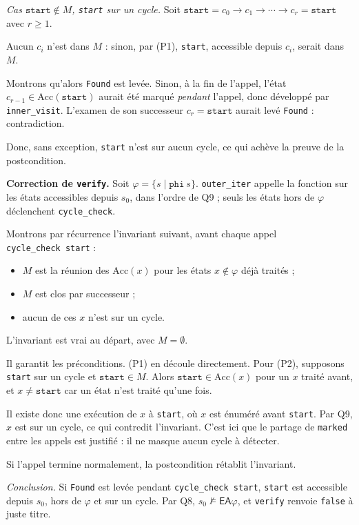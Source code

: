 \documentclass[11pt,a4paper]{article}
\providecommand{\tightlist}{\setlength{\itemsep}{0pt}\setlength{\parskip}{0pt}}
\providecommand{\varnothing}{\emptyset}
\begin{document}
\emph{Cas \(\texttt{start}\notin M\), \texttt{start} sur un cycle.} Soit \(\texttt{start}=c_0\to c_1\to\cdots\to c_r=\texttt{start}\) avec \(r\ge1\).

Aucun \(c_i\) n'est dans \(M\) : sinon, par (P1), \texttt{start}, accessible depuis \(c_i\), serait dans \(M\).

Montrons qu'alors \texttt{Found} est levée. Sinon, à la fin de l'appel, l'état \(c_{r-1}\in\mathrm{Acc}(\texttt{start})\) aurait été marqué \emph{pendant} l'appel, donc développé par \texttt{inner\_visit}. L'examen de son successeur \(c_r=\texttt{start}\) aurait levé \texttt{Found} : contradiction.

Donc, sans exception, \texttt{start} n'est sur aucun cycle, ce qui achève la preuve de la postcondition.

\textbf{Correction de \texttt{verify}.} Soit \(\varphi=\{s\mid \texttt{phi}\ s\}\). \texttt{outer\_iter} appelle la fonction sur les états accessibles depuis \(s_0\), dans l'ordre de Q9 ; seuls les états hors de \(\varphi\) déclenchent \texttt{cycle\_check}.

Montrons par récurrence l'invariant suivant, avant chaque appel \texttt{cycle\_check\ start} :

\begin{itemize}
\tightlist
\item
  \(M\) est la réunion des \(\mathrm{Acc}(x)\) pour les états \(x\notin\varphi\) déjà traités ;
\item
  \(M\) est clos par successeur ;
\item
  aucun de ces \(x\) n'est sur un cycle.
\end{itemize}

L'invariant est vrai au départ, avec \(M=\varnothing\).

Il garantit les préconditions. (P1) en découle directement. Pour (P2), supposons \texttt{start} sur un cycle et \(\texttt{start}\in M\). Alors \(\texttt{start}\in\mathrm{Acc}(x)\) pour un \(x\) traité avant, et \(x\neq\texttt{start}\) car un état n'est traité qu'une fois.

Il existe donc une exécution de \(x\) à \texttt{start}, où \(x\) est énuméré avant \texttt{start}. Par Q9, \(x\) est sur un cycle, ce qui contredit l'invariant. C'est ici que le partage de \texttt{marked} entre les appels est justifié : il ne masque aucun cycle à détecter.

Si l'appel termine normalement, la postcondition rétablit l'invariant.

\emph{Conclusion.} Si \texttt{Found} est levée pendant \texttt{cycle\_check\ start}, \texttt{start} est accessible depuis \(s_0\), hors de \(\varphi\) et sur un cycle. Par Q8, \(s_0\not\models\mathsf{EA}\varphi\), et \texttt{verify} renvoie \texttt{false} à juste titre.
\end{document}
